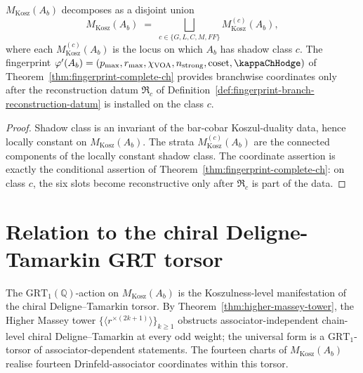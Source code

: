 \begin{theorem}
\label{thm:mkosz-shadow-stratification}
$M_{\mathrm{Kosz}}(A_b)$ decomposes as a disjoint union
\[
 M_{\mathrm{Kosz}}(A_b)
 \;=\;
 \bigsqcup_{c \in \{G, L, C, M, FF\}} M_{\mathrm{Kosz}}^{(c)}(A_b),
\]
where each $M_{\mathrm{Kosz}}^{(c)}(A_b)$ is the locus on which $A_b$
has shadow class $c$. The fingerprint $\varphi'(A_b) = (p_{\max},
r_{\max}, \chi_{\mathrm{VOA}}, n_{\mathrm{strong}}, \mathrm{coset},
\kappaChHodge)$ of Theorem~\ref{thm:fingerprint-complete-ch} provides
branchwise coordinates only after the reconstruction datum
\(\mathfrak R_c\) of
Definition~\ref{def:fingerprint-branch-reconstruction-datum} is
installed on the class \(c\).
\end{theorem}

\begin{proof}
Shadow class is an invariant of the bar-cobar Koszul-duality data,
hence locally constant on $M_{\mathrm{Kosz}}(A_b)$. The strata
$M_{\mathrm{Kosz}}^{(c)}(A_b)$ are the connected components of the
locally constant shadow class. The coordinate assertion is exactly the
conditional assertion of Theorem~\ref{thm:fingerprint-complete-ch}:
on class \(c\), the six slots become reconstructive only after
\(\mathfrak R_c\) is part of the data.
\end{proof}

\section{Relation to the chiral Deligne-Tamarkin GRT torsor}
\label{sec:mkosz-grt-torsor}

\begin{remark}
The $\mathrm{GRT}_1(\mathbb{Q})$-action on $M_{\mathrm{Kosz}}(A_b)$ is the
Koszulness-level manifestation of the chiral Deligne--Tamarkin torsor.
By Theorem~\ref{thm:higher-massey-tower}, the Higher Massey tower
$\{\langle r^{\times(2k+1)}\rangle\}_{k \ge 1}$ obstructs
associator-independent chain-level chiral Deligne--Tamarkin at every odd
weight; the universal form is a $\mathrm{GRT}_1$-torsor of
associator-dependent statements. The fourteen charts of
$M_{\mathrm{Kosz}}(A_b)$ realise fourteen Drinfeld-associator coordinates
within this torsor.
\end{remark}

